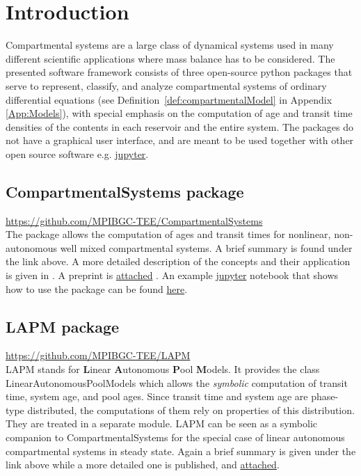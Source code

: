 \documentclass[a4paper]{article}
\DeclareRobustCommand{\Defref}[1]{\mbox{Definition \ref{#1}}}
\DeclareRobustCommand{\Appendixref}[1]{Appendix \ref{#1}}
\begin{document}
\section{Introduction}
Compartmental systems are a large class of dynamical systems used in many different scientific applications
where mass balance has to be considered.
The presented software framework consists of three open-source python packages 
that serve to represent, classify, and analyze compartmental systems of ordinary 
differential equations (see \Defref{def:compartmentalModel} in \Appendixref{App:Models}), 
with special emphasis on the computation of age and transit time densities of the contents in each reservoir and the entire system.  
The packages do not have a graphical user interface, and are meant to be used together with other open source software e.g. \href{jupyter.org}{jupyter}. 

\subsection{CompartmentalSystems package}
\url{https://github.com/MPIBGC-TEE/CompartmentalSystems}\\
The package allows the computation of ages and transit times for nonlinear, 
non-autonomous well mixed compartmental systems.
A brief summary is found under the link above. A more detailed description of the
concepts and their application is given in \citet[]{MetzlerMuellerSierra2018PNAS}. 
A preprint is \href{https://github.com/MPIBGC-TEE/bgc-md/blob/master/docs/SiamSoftwareContest/PNAS.pdf}{attached} .
An example \href{jupyter.org}{jupyter} notebook that shows how to use the package 
can be found 
\href{http://compartmentalsystems.readthedocs.io/en/latest/_downloads/nonl_gcm_3p.html}{here}.

\subsection{LAPM package}
\url{https://github.com/MPIBGC-TEE/LAPM}\\
LAPM stands for {\bf L}inear {\bf A}utonomous {\bf P}ool {\bf M}odels. It provides the class LinearAutonomousPoolModels 
which allows the \emph{symbolic} computation of transit time, system age, and pool ages.
Since transit time and system age are phase-type distributed, the computations of them rely on properties of this distribution. They are treated in a separate module.
LAPM can be seen as a symbolic companion to CompartmentalSystems for the special case of linear autonomous compartmental systems in steady state.
Again a brief summary is given under the link above while a more detailed one is published, \cite[]{Metzler2017MGS} and \href{https://github.com/MPIBGC-TEE/bgc-md/blob/master/docs/SiamSoftwareContest/markov.pdf}{attached}. 
\end{document}
